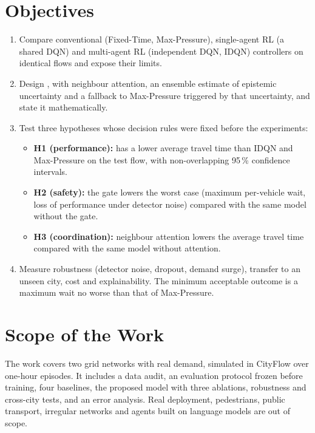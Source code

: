 \section{Objectives}

\begin{enumerate}
\item Compare conventional (Fixed-Time, Max-Pressure), single-agent RL (a shared DQN) and
multi-agent RL (independent DQN, IDQN) controllers on identical flows and expose their limits.
\item Design \ugmarl{}, with neighbour attention, an ensemble estimate of epistemic
uncertainty and a fallback to Max-Pressure triggered by that uncertainty, and state it
mathematically.
\item Test three hypotheses whose decision rules were fixed before the experiments:
\begin{itemize}
\item \textbf{H1 (performance):} \ugmarl{} has a lower average travel time than IDQN and
Max-Pressure on the test flow, with non-overlapping 95\,\% confidence intervals.
\item \textbf{H2 (safety):} the gate lowers the worst case (maximum per-vehicle wait, loss
of performance under detector noise) compared with the same model without the gate.
\item \textbf{H3 (coordination):} neighbour attention lowers the average travel time
compared with the same model without attention.
\end{itemize}
\item Measure robustness (detector noise, dropout, demand surge), transfer to an unseen
city, cost and explainability. The minimum acceptable outcome is a maximum wait no worse
than that of Max-Pressure.
\end{enumerate}

\section{Scope of the Work}

The work covers two grid networks with real demand, simulated in CityFlow
\citep{zhang2019cityflow} over one-hour episodes. It includes a data audit, an evaluation
protocol frozen before training, four baselines, the proposed model with three ablations,
robustness and cross-city tests, and an error analysis. Real deployment, pedestrians, public
transport, irregular networks and agents built on language models are out of scope.

